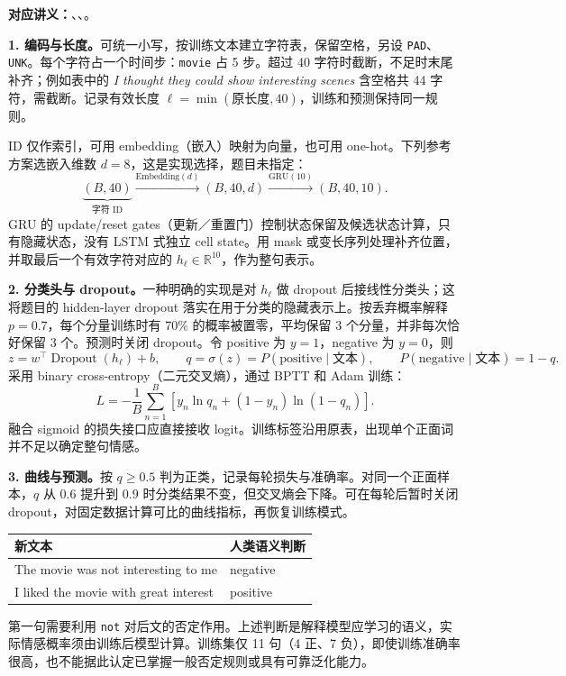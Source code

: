\textbf{对应讲义：}、、。

\textbf{1. 编码与长度。}可统一小写，按训练文本建立字符表，保留空格，另设 \texttt{PAD}、\texttt{UNK}。每个字符占一个时间步：\texttt{movie} 占 5 步。超过 40 字符时截断，不足时末尾补齐；例如表中的 \emph{I thought they could show interesting scenes} 含空格共 44 字符，需截断。记录有效长度 $\ell=\min(\text{原长度},40)$，训练和预测保持同一规则。

ID 仅作索引，可用 embedding（嵌入）映射为向量，也可用 one-hot。下列参考方案选嵌入维数 $d=8$，这是实现选择，题目未指定：
\[
 \underbrace{(B,40)}_{\text{字符 ID}}
 \xrightarrow{\mathrm{Embedding}(d)}(B,40,d)
 \xrightarrow{\mathrm{GRU}(10)}(B,40,10).
\]
GRU 的 update/reset gates（更新／重置门）控制状态保留及候选状态计算，只有隐藏状态，没有 LSTM 式独立 cell state。用 mask 或变长序列处理补齐位置，并取最后一个有效字符对应的 $h_\ell\in\mathbb R^{10}$，作为整句表示。

\textbf{2. 分类头与 dropout。}一种明确的实现是对 $h_\ell$ 做 dropout 后接线性分类头；这将题目的 hidden-layer dropout 落实在用于分类的隐藏表示上。按丢弃概率解释 $p=0.7$，每个分量训练时有 70\% 的概率被置零，平均保留 3 个分量，并非每次恰好保留 3 个。预测时关闭 dropout。令 positive 为 $y=1$，negative 为 $y=0$，则
\[
 z=w^\top\operatorname{Dropout}(h_\ell)+b,\qquad
 q=\sigma(z)=P(\text{positive}\mid\text{文本}),\qquad
 P(\text{negative}\mid\text{文本})=1-q.
\]
采用 binary cross-entropy（二元交叉熵），通过 BPTT 和 Adam 训练：
\[
 L=-\frac1B\sum_{n=1}^{B}\left[y_n\ln q_n+(1-y_n)\ln(1-q_n)\right].
\]
融合 sigmoid 的损失接口应直接接收 logit。训练标签沿用原表，出现单个正面词并不足以确定整句情感。

\textbf{3. 曲线与预测。}按 $q\ge0.5$ 判为正类，记录每轮损失与准确率。对同一个正面样本，$q$ 从 $0.6$ 提升到 $0.9$ 时分类结果不变，但交叉熵会下降。可在每轮后暂时关闭 dropout，对固定数据计算可比的曲线指标，再恢复训练模式。

\begin{center}
\small
\begin{tabularx}{\textwidth}{@{}Xl@{}}
\toprule
新文本 & 人类语义判断 \\
\midrule
The movie was not interesting to me & negative \\
I liked the movie with great interest & positive \\
\bottomrule
\end{tabularx}
\end{center}
第一句需要利用 \texttt{not} 对后文的否定作用。上述判断是解释模型应学习的语义，实际情感概率须由训练后模型计算。训练集仅 11 句（4 正、7 负），即使训练准确率很高，也不能据此认定已掌握一般否定规则或具有可靠泛化能力。
\endgroup
